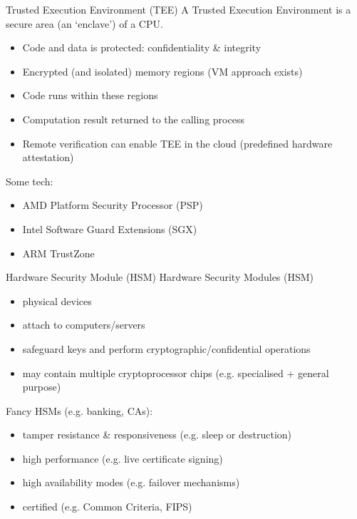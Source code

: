 \begin{frame}{Trusted Execution Environment (TEE)}
  A Trusted Execution Environment is a secure area (an `enclave') of a CPU.
  \begin{itemize}[<+(1)->]
    \item Code and data is protected: confidentiality \& integrity
    \item Encrypted (and isolated) memory regions (VM approach exists)
    \item Code runs within these regions
    \item Computation result returned to the calling process
    \item Remote verification can enable TEE in the cloud (predefined hardware attestation)
  \end{itemize}

  \pause
  Some tech:
  \begin{itemize}[<+(1)->]
    \item AMD Platform Security Processor (PSP)
    \item Intel Software Guard Extensions (SGX)
    \item ARM TrustZone
  \end{itemize}
\end{frame}

\begin{frame}{Hardware Security Module (HSM)}
  Hardware Security Modules (HSM)
  \begin{itemize}[<+(1)->]
    \item physical devices
    \item attach to computers/servers
    \item safeguard keys and perform cryptographic/confidential operations
    \item may contain multiple cryptoprocessor chips (e.g. specialised + general purpose)
  \end{itemize}

  \pause
  Fancy HSMs (e.g. banking, CAs):
  \begin{itemize}[<+(1)->]
    \item tamper resistance \& responsiveness (e.g. sleep or destruction)
    \item high performance (e.g. live certificate signing)
    \item high availability modes (e.g. failover mechanisms)
    \item certified (e.g. Common Criteria, FIPS)
  \end{itemize}
\end{frame}

